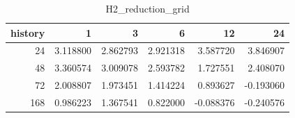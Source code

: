 \begin{table}
\caption{H2_reduction_grid}
\label{tab:H2_reduction_grid}
\begin{tabular}{rrrrrr}
\toprule
history & 1 & 3 & 6 & 12 & 24 \\
\midrule
24 & 3.118800 & 2.862793 & 2.921318 & 3.587720 & 3.846907 \\
48 & 3.360574 & 3.009078 & 2.593782 & 1.727551 & 2.408070 \\
72 & 2.008807 & 1.973451 & 1.414224 & 0.893627 & -0.193060 \\
168 & 0.986223 & 1.367541 & 0.822000 & -0.088376 & -0.240576 \\
\bottomrule
\end{tabular}
\end{table}
